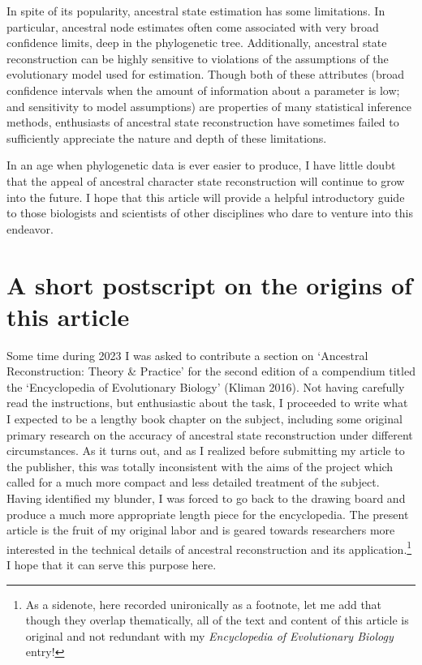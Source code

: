 \documentclass{article}
\begin{document}
In spite of its popularity, ancestral state estimation has some limitations. In particular, ancestral node estimates often come associated with very broad confidence limits, deep in the phylogenetic tree. Additionally, ancestral state reconstruction can be highly sensitive to violations of the assumptions of the evolutionary model used for estimation. Though both of these attributes (broad confidence intervals when the amount of information about a parameter is low; and sensitivity to model assumptions) are properties of many statistical inference methods, enthusiasts of ancestral state reconstruction have sometimes failed to sufficiently appreciate the nature and depth of these limitations.

In an age when phylogenetic data is ever easier to produce, I have little doubt that the appeal of ancestral character state reconstruction will continue to grow into the future. I hope that this article will provide a helpful introductory guide to those biologists and scientists of other disciplines who dare to venture into this endeavor.

\section{A short postscript on the origins of this article}\label{a-short-postscript-on-the-origins-of-this-article}

Some time during 2023 I was asked to contribute a section on `Ancestral Reconstruction: Theory \& Practice' for the second edition of a compendium titled the `Encyclopedia of Evolutionary Biology' (Kliman 2016). Not having carefully read the instructions, but enthusiastic about the task, I proceeded to write what I expected to be a lengthy book chapter on the subject, including some original primary research on the accuracy of ancestral state reconstruction under different circumstances. As it turns out, and as I realized before submitting my article to the publisher, this was totally inconsistent with the aims of the project which called for a much more compact and less detailed treatment of the subject. Having identified my blunder, I was forced to go back to the drawing board and produce a much more appropriate length piece for the encyclopedia. The present article is the fruit of my original labor and is geared towards researchers more interested in the technical details of ancestral reconstruction and its application.\footnote{As a sidenote, here recorded unironically as a footnote, let me add that though they overlap thematically, all of the text and content of this article is original and not redundant with my \emph{Encyclopedia of Evolutionary Biology} entry!} I hope that it can serve this purpose here.
\end{document}
